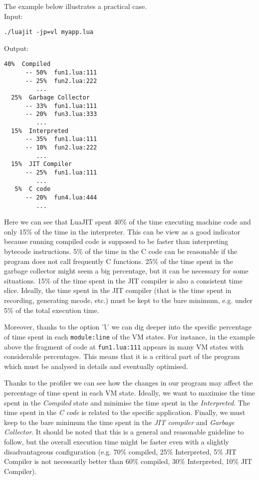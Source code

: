 The example below illustrates a practical case.\\

\noindent
Input:
\begin{lstlisting}[style=CommandsLuaJIT]
  ./luajit -jp=vl myapp.lua
\end{lstlisting}

\noindent
Output:
\begin{lstlisting}[style=CommandsLuaJIT]
  40%  Compiled
	  -- 50%  fun1.lua:111
	  -- 25%  fun2.lua:222
	     ...
  25%  Garbage Collector
	  -- 33%  fun1.lua:111
	  -- 20%  fun3.lua:333
	     ...
  15%  Interpreted
	  -- 35%  fun1.lua:111
	  -- 10%  fun2.lua:222
	     ...
  15%  JIT Compiler
	  -- 25%  fun1.lua:111
	     ...
   5%  C code
	  -- 20%  fun4.lua:444
	     ...
\end{lstlisting}

\noindent
Here we can see that LuaJIT spent 40\% of the time executing machine code and only 15\% of the time in the interpreter. This can be view as a good indicator because running compiled code is supposed to be faster than interpreting bytecode instructions. 5\% of the time in the C code can be reasonable if the program does not call frequently C functions. 25\% of the time spent in the garbage collector might seem a big percentage, but it can be necessary for some situations. 15\% of the time spent in the JIT compiler is also a consistent time slice. Ideally, the time spent in the JIT compiler (that is the time spent in recording, generating mcode, etc.) must be kept to the bare minimum, e.g. under 5\% of the total execution time.

Moreover, thanks to the option '\texttt{l}' we can dig deeper into the specific percentage of time spent in each \texttt{module:line} of the VM states. For instance, in the example above the fragment of code at \texttt{fun1.lua:111} appears in many VM states with considerable percentages. This means that it is a critical part of the program which must be analysed in details and eventually optimised. 


Thanks to the profiler we can see how the changes in our program may affect the percentage of time spent in each VM state. Ideally, we want to maximise the time spent in the \textit{Compiled} state and minimise the time spent in the \textit{Interpreted}. The time spent in the \textit{C code} is related to the specific application. Finally, we must keep to the bare minimum the time spent in the \textit{JIT compiler} and \textit{Garbage Collector}. It should be noted that this is a general and reasonable guideline to follow, but the overall execution time might be faster even with a slightly disadvantageous configuration (e.g. 70\% compiled, 25\% Interpreted, 5\% JIT Compiler is not necessarily better than 60\% compiled, 30\% Interpreted, 10\% JIT Compiler).

